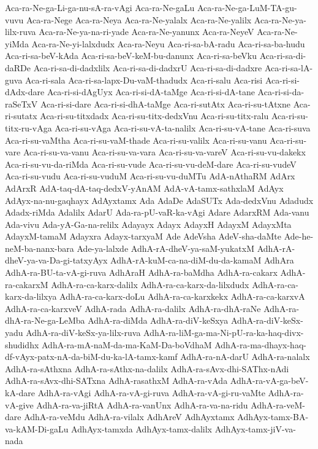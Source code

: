 {Aca-ra-Ne-ga-Li-ga-nu-sA-ra-vAgi
Aca-ra-Ne-gaLu
Aca-ra-Ne-ga-LuM-TA-gu-vuvu
Aca-ra-Nege
Aca-ra-Neya
Aca-ra-Ne-yalalx
Aca-ra-Ne-yalilx
Aca-ra-Ne-ya-lilx-ruva
Aca-ra-Ne-ya-na-ri-yade
Aca-ra-Ne-yanunx
Aca-ra-NeyeV
Aca-ra-Ne-yiMda
Aca-ra-Ne-yi-lalxdudx
Aca-ra-Neyu
Aca-ri-sa-bA-radu
Aca-ri-sa-ba-hudu
Aca-ri-sa-beV-kAda
Aca-ri-sa-beV-keM-bu-danunx
Aca-ri-sa-beVku
Aca-ri-sa-di-daRDe
Aca-ri-sa-di-dadxlilx
Aca-ri-sa-di-dadxrU
Aca-ri-sa-di-dadxre
Aca-ri-sa-lA-guva
Aca-ri-sala
Aca-ri-sa-lapx-Du-vaM-thadudx
Aca-ri-salu
Aca-risi
Aca-ri-si-dAdx-dare
Aca-ri-si-dAgUyx
Aca-ri-si-dA-taMge
Aca-ri-si-dA-tane
Aca-ri-si-da-raSeTxV
Aca-ri-si-dare
Aca-ri-si-dhA-taMge
Aca-ri-sutAtx
Aca-ri-su-tAtxne
Aca-ri-sutatx
Aca-ri-su-titxdadx
Aca-ri-su-titx-dedxVnu
Aca-ri-su-titx-ralu
Aca-ri-su-titx-ru-vAga
Aca-ri-su-vAga
Aca-ri-su-vA-ta-nalilx
Aca-ri-su-vA-tane
Aca-ri-suva
Aca-ri-su-vaMtha
Aca-ri-su-vaM-thade
Aca-ri-su-valilx
Aca-ri-su-vanu
Aca-ri-su-vare
Aca-ri-su-va-vanu
Aca-ri-su-va-vara
Aca-ri-su-va-vareV
Aca-ri-su-vu-dakekx
Aca-ri-su-vu-da-riMda
Aca-ri-su-vude
Aca-ri-su-vu-deM-dare
Aca-ri-su-vudeV
Aca-ri-su-vudu
Aca-ri-su-vuduM
Aca-ri-su-vu-duMTu
AdA-nAthaRM
AdArx
AdArxR
AdA-taq-dA-taq-dedxV-yAnAM
AdA-vA-tamx-sathxlaM
AdAyx
AdAyx-na-nu-gaqhayx
AdAyxtamx
Ada
AdaDe
AdaSUTx
Ada-dedxVnu
Adadudx
Adadx-riMda
Adalilx
AdarU
Ada-ra-pU-vaR-ka-vAgi
Adare
AdarxRM
Ada-vanu
Ada-vivu
Ada-yA-Ga-na-relilx
Adayayx
Adayx
AdayxH
AdayxM
AdayxMta
AdayxM-tamaM
Adayxra
Adayx-tarxyaM
Ade
AdeVsha
AdeV-sha-daMte
Ade-he-neM-ba-nanx-bara
Ade-ya-lalxde
AdhA-rA-dheV-ya-saM-yukatxM
AdhA-rA-dheV-ya-va-Da-gi-tatxyAyx
AdhA-rA-kuM-ca-na-diM-du-da-kamaM
AdhAra
AdhA-ra-BU-ta-vA-gi-ruva
AdhAraH
AdhA-ra-baMdha
AdhA-ra-cakarx
AdhA-ra-cakarxM
AdhA-ra-ca-karx-dalilx
AdhA-ra-ca-karx-da-lilxdudx
AdhA-ra-ca-karx-da-lilxya
AdhA-ra-ca-karx-doLu
AdhA-ra-ca-karxkekx
AdhA-ra-ca-karxvA
AdhA-ra-ca-karxveV
AdhA-rada
AdhA-ra-dalilx
AdhA-ra-dhA-raNe
AdhA-ra-dhA-ra-Ne-ga-LeMba
AdhA-ra-diMda
AdhA-ra-diV-keSxya
AdhA-ra-diV-keSx-yadu
AdhA-ra-diV-keSx-ya-lilx-ruva
AdhA-ra-liM-ga-ma-Ni-pU-ra-ka-haq-divx-shudidhx
AdhA-ra-mA-naM-da-ma-KaM-Da-boVdhaM
AdhA-ra-ma-dhayx-haq-df-vAyx-patx-nA-da-biM-du-ka-lA-tamx-kamf
AdhA-ra-nA-darU
AdhA-ra-nalalx
AdhA-ra-sAthxna
AdhA-ra-sAthx-na-dalilx
AdhA-ra-sAvx-dhi-SAThx-nAdi
AdhA-ra-sAvx-dhi-SATxna
AdhA-rasathxM
AdhA-ra-vAda
AdhA-ra-vA-ga-beV-kA-dare
AdhA-ra-vAgi
AdhA-ra-vA-gi-ruva
AdhA-ra-vA-gi-ru-vaMte
AdhA-ra-vA-give
AdhA-ra-va-jiRtA
AdhA-ra-vanUnx
AdhA-ra-va-na-ridu
AdhA-ra-veM-dare
AdhA-ra-veMdu
AdhA-ra-vilalx
AdhAreV
AdhAyxtamx
AdhAyx-tamx-BA-va-kAM-Di-gaLu
AdhAyx-tamxda
AdhAyx-tamx-dalilx
AdhAyx-tamx-jiV-va-nada
}
